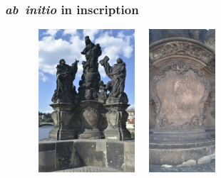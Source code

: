 \frame
{
	\frametitle{\textit{ab~initio} \textrm{in inscription}}
\begin{figure}[h!]
\vspace*{-0.15in}
\centering
\includegraphics[height=2.10in,width=1.55in,viewport=5 3 1550 2180,clip]{Figures/Madonna-Ss.-Dominic-and-Thomas_Aquinas-3.jpeg}
\hspace*{15pt}
\includegraphics[height=2.10in,width=1.15in,viewport=5 3 950 1880,clip]{Figures/Madonna-Ss.-Dominic-and-Thomas_Aquinas-Inscription_2.jpeg}
\label{ABINITIO-inscription}
\end{figure}
\begin{minipage}{0.53\textwidth}
	{\fontsize{8.2pt}{4.2pt}}
\end{minipage}
\hspace*{5pt}
\begin{minipage}{0.30\textwidth}
	\textrm{\fontsize{4.2pt}{4.2pt}\selectfont{The inscription in English:}}\\
	\textrm{\fontsize{8.2pt}{4.2pt}\selectfont{\textcolor{blue}{Mind the congregation that has been yours} \textcolor{purple}{since the beginning}}}
\end{minipage}
}

